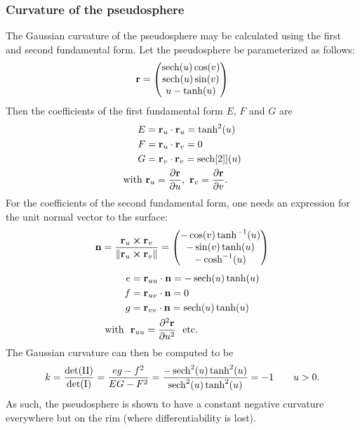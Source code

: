 \subsubsection{Curvature of the pseudosphere}
The Gaussian curvature of the pseudosphere may be calculated using the first and second fundamental form. Let the pseudosphere be parameterized as follows: 
    \[ 
        \vb{r} = \mqty(\sech(u)\cos(v)\\
                      \sech(u)\sin(v)\\
                  u - \tanh(u))
    \]
Then the coefficients of the first fundamental form \(E\), \(F\) and \(G\) are
    \[
        \begin{split}
            E &= \vb{r}_u \cdot \vb{r}_u = \tanh[2](u) \\
            F &= \vb{r}_u \cdot \vb{r}_v = 0 \\
            G &= \vb{r}_v \cdot \vb{r}_v = \sech[2]](u) \\
            \text{with } & \vb{r}_u = \pdv{\vb{r}}{u},\ \vb{r}_v = \pdv{\vb{r}}{v}.
        \end{split}
    \]
For the coefficients of the second fundamental form, one needs an expression for the unit normal vector to the surface:
    \[
        \vb{n} =  \frac{\vb{r}_u \cross \vb{r}_v}{\norm{\vb{r}_u \cross \vb{r}_v}} 
        = \mqty(-\cos(v)\tanh[-1](u) \\
                -\sin(v)\tanh(u)\\
                -\cosh[-1](u)\\
                )
    \]
\begin{equation*}
    \begin{split}
        e &= \vb{r}_{uu} \cdot \vb{n} = -\sech(u)\tanh(u)\\
        f &= \vb{r}_{uv} \cdot \vb{n} = 0\\
        g &= \vb{r}_{vv} \cdot \vb{n} = \sech(u)\tanh(u)\\
        \text{with }\ & \vb{r}_{uu} = \pdv[2]{\vb{r}}{u}\ \text{ etc.}
    \end{split}
\end{equation*}
The Gaussian curvature can then be computed to be \cite{ONeill2006}
\begin{equation}
    k = \frac{\det(\mathrm{II})}{\det(\mathrm{I})} = \frac{eg - f^2}{EG - F^2} = \frac{-\sech[2](u)\tanh[2](u)}{\sech[2](u)\tanh[2](u)} = -1 \qquad u > 0.
\end{equation}
As such, the pseudosphere is shown to have a constant negative curvature everywhere but on the rim (where differentiability is lost).

